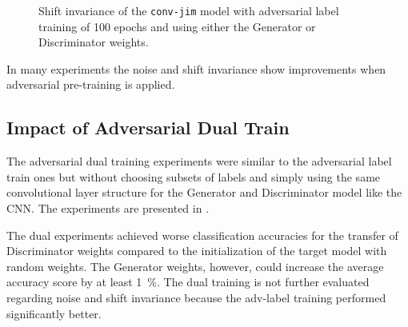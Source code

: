 \FloatBarrier
\noindent
\begin{figure}[!ht]
  \centering
  \quad
  \caption{Shift invariance of the \texttt{conv-jim} model with adversarial label training of 100 epochs and using either the Generator or Discriminator weights.}
  \label{fig:exp_adv_label_tb_shift_conv-jim}
\end{figure}
\FloatBarrier
\noindent
In many experiments the noise and shift invariance show improvements when adversarial pre-training is applied. 



\subsection{Impact of Adversarial Dual Train}
The adversarial dual training experiments were similar to the adversarial label train ones but without choosing subsets of labels and simply using the same convolutional layer structure for the Generator and Discriminator model like the CNN.
The experiments are presented in .

The dual experiments achieved worse classification accuracies for the transfer of Discriminator weights compared to the initialization of the target model with random weights.
The Generator weights, however, could increase the average accuracy score by at least \SI{1}{\percent}.
The dual training is not further evaluated regarding noise and shift invariance because the adv-label training performed significantly better.